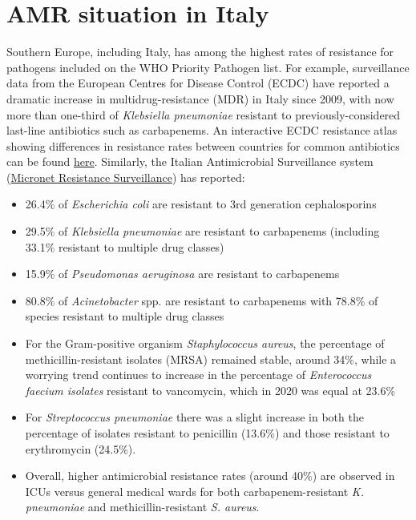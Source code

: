 \documentclass[
]{book}
\providecommand{\tightlist}{%
  \setlength{\itemsep}{0pt}\setlength{\parskip}{0pt}}
\begin{document}
\hypertarget{amr-situation-in-italy}{%
\section*{AMR situation in Italy}\label{amr-situation-in-italy}}

Southern Europe, including Italy, has among the highest rates of resistance for pathogens included on the WHO Priority Pathogen list. For example, surveillance data from the European Centres for Disease Control (ECDC) have reported a dramatic increase in multidrug-resistance (MDR) in Italy since 2009, with now more than one-third of \emph{Klebsiella pneumoniae} resistant to previously-considered last-line antibiotics such as carbapenems. An interactive ECDC resistance atlas showing differences in resistance rates between countries for common antibiotics can be found \href{https://atlas.ecdc.europa.eu/public/index.aspx?Dataset=27\&HealthTopic=4}{here}. Similarly, the Italian Antimicrobial Surveillance system (\href{https://www.epicentro.iss.it/antibiotico-resistenza/epidemiologia-italia}{Micronet Resistance Surveillance}) has reported:

\begin{itemize}
\tightlist
\item
  26.4\% of \emph{Escherichia coli} are resistant to 3rd generation cephalosporins
\item
  29.5\% of \emph{Klebsiella pneumoniae} are resistant to carbapenems (including 33.1\% resistant to multiple drug classes)
\item
  15.9\% of \emph{Pseudomonas aeruginosa} are resistant to carbapenems
\item
  80.8\% of \emph{Acinetobacter} spp. are resistant to carbapenems with 78.8\% of species resistant to multiple drug classes
\item
  For the Gram-positive organism \emph{Staphylococcus aureus}, the percentage of methicillin-resistant isolates (MRSA) remained stable, around 34\%, while a worrying trend continues to increase in the percentage of \emph{Enterococcus faecium isolates} resistant to vancomycin, which in 2020 was equal at 23.6\%
\item
  For \emph{Streptococcus pneumoniae} there was a slight increase in both the percentage of isolates resistant to penicillin (13.6\%) and those resistant to erythromycin (24.5\%).
\item
  Overall, higher antimicrobial resistance rates (around 40\%) are observed in ICUs versus general medical wards for both carbapenem-resistant \emph{K. pneumoniae} and methicillin-resistant \emph{S. aureus}.
\end{itemize}
\end{document}

